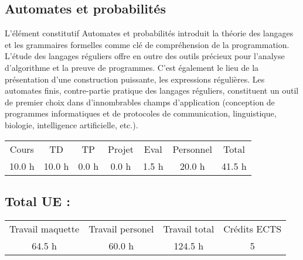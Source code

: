 \subsection{Automates et probabilités}%
\label{subsec:Automatesetprobabilits}%

%
L'élément constitutif Automates et probabilités introduit la théorie des langages et les grammaires formelles comme clé de compréhension de la programmation. L’étude des langages réguliers offre en outre des outils précieux pour l’analyse d’algorithme et la preuve de programmes. C’est également le lieu de la présentation d’une construction puissante, les expressions régulières. Les automates finis, contre{-}partie pratique des langages réguliers, constituent un outil de premier choix dans d’innombrables champs d’application (conception de programmes informatiques et de protocoles de communication, linguistique, biologie, intelligence artificielle, etc.).%
\begin{longtable}{c c c c c c c}%
\hline%
Cours&TD&TP&Projet&Eval&Personnel&Total\\%
10.0 h&10.0 h&0.0 h&0.0 h&1.5 h&20.0 h&41.5 h\\%
\hline%
\end{longtable}%
\subsection{Total UE :}%
\label{subsec:TotalUE}%

%
\begin{longtable}{c c c c}%
\hline%
Travail maquette&Travail personel&Travail total&Crédits ECTS\\%
64.5 h&60.0 h&124.5 h&5\\%
\hline%
\end{longtable}